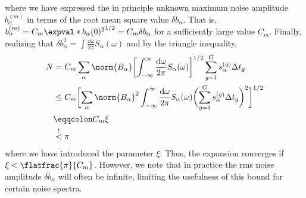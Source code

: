 where we have expressed the in principle unknown maximum noise amplitude $b_\alpha^{(m)}$ in terms of the root mean square value $\delta b_\alpha$. That is, $b_\alpha^{(m)} = C_m \expval*{b_\alpha(0)^2}^{1/2} =  C_m \delta b_\alpha$ for a sufficiently large value $C_m$. Finally, realizing that $\delta b_\alpha^2 = \int\frac{\dd{\omega}}{2\pi} S_\alpha(\omega)$ and by the triangle inequality,
\begin{equation}
    \begin{split}
        N &= C_m\sum_{\alpha}\norm{B_\alpha}\biggl[\int_{-\infty}^\infty\frac{\mathrm{d}\omega}{2\pi} S_\alpha(\omega)\biggr]^{1/2}
            \sum_{g=1}^{G} s_\alpha^{(g)}\Delta t_g \\
          &\leq C_m\biggl[\sum_{\alpha}\norm{B_\alpha}^2\int_{-\infty}^\infty\frac{\mathrm{d}\omega}{2\pi} S_\alpha(\omega)
            \biggl(\sum_{g=1}^{G} s_\alpha^{(g)}\Delta t_g\biggr)^2\biggr]^{1/2} \\
          &\eqqcolon C_m\xi \\
          &\overset{!}{<} \pi
    \end{split}
\end{equation}
where we have introduced the parameter $\xi$. Thus, the expansion converges if $\xi < \flatfrac{\pi}{C_m}$. However, we note that in practice the rms noise amplitude $\delta b_\alpha$ will often be infinite, limiting the usefulness of this bound for certain noise spectra.
